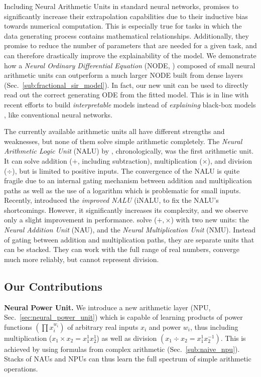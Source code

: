\documentclass[9pt]{article}
\begin{document}
Including Neural Arithmetic Units in standard neural networks, promises to
significantly increase their extrapolation capabilities due to their inductive
bias towards numerical computation. This is especially true for tasks in which
the data generating process contains mathematical relationships.  Additionally,
they promise to reduce the number of parameters that are needed for a given
task, and can therefore drastically improve the explainability of the model.
We demonstrate how a \emph{Neural Ordinary Differential Equation} (NODE,
\cite{chen_neural_2019}) composed of small neural arithmetic units can
outperform a much larger NODE built from dense layers (Sec.~\ref{sub:fractional_sir_model}).
In fact, our new unit can be used to directly read out the correct generating ODE
from the fitted model.  This is in line with recent efforts to build
\emph{interpretable} models instead of \emph{explaining} black-box models
\citep{rudin_stop_2019}, like conventional neural networks.

The currently available arithmetic units all have different strengths and
weaknesses, but none of them solve simple arithmetic completely.
The \emph{Neural Arithmetic Logic Unit} (NALU) by \cite{trask_neural_2018},
chronologically, was the first arithmetic unit. It can solve
addition ($+$, including subtraction), multiplication ($\times$), and division
($\div$), but is limited to positive inputs. The convergence of the
NALU is quite fragile due to an internal gating mechanism between addition and
multiplication paths as well as the use of a logarithm which is problematic for
small inputs.  Recently, \cite{schlor_inalu_2020} introduced the \emph{improved NALU} (iNALU,
to fix the NALU's shortcomings. However, it significantly increases its complexity, and we
observe only a slight improvement in performance.
\cite{madsen_neural_2020} solve ($+,\times$) with two new units: the
\emph{Neural Addition Unit} (NAU), and the \emph{Neural Multiplication Unit}
(NMU). Instead of gating between addition and multiplication paths, they are
separate units that can be stacked. They can work with the full range of real
numbers, converge much more reliably, but cannot represent
division.


\subsection*{Our Contributions}%
\label{sub:our_contribution}

\textbf{Neural Power Unit.}
We introduce a new arithmetic layer (NPU, Sec.~\ref{sec:neural_power_unit})
which is capable of learning products of power functions $(\prod x_{i}^{w_i})$ of
arbitrary real inputs $x_i$ and power $w_i$, thus including multiplication
($x_1\times x_2 = x_1^1 x_2^1$) as well as division $(x_1\div
x_2=x_1^{1}x_2^{-1})$. This is achieved by using formulas from complex
arithmetic (Sec.~\ref{sub:naive_npu}).  Stacks of NAUs and NPUs can thus learn
the full spectrum of simple arithmetic operations.
\end{document}

